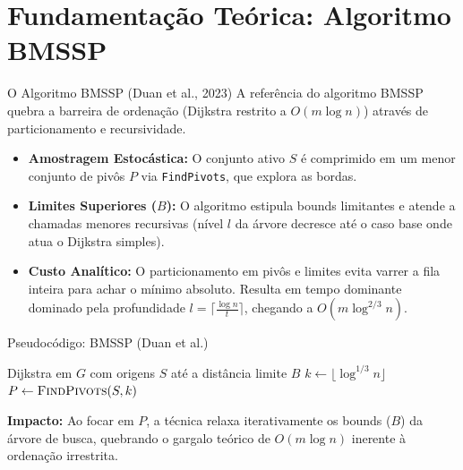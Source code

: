 \documentclass[aspectratio=169, 11pt]{beamer}
\begin{document}
\section{Fundamentação Teórica: Algoritmo BMSSP}
\begin{frame}{O Algoritmo BMSSP (Duan et al., 2023)}
    A referência do algoritmo BMSSP quebra a barreira de ordenação (Dijkstra restrito a $O(m \log n)$) através de particionamento e recursividade.
    
    \vspace{0.2cm}
    \begin{itemize}
        \item \textbf{Amostragem Estocástica:} O conjunto ativo $S$ é comprimido em um menor conjunto de pivôs $P$ via \texttt{FindPivots}, que explora as bordas.
        \item \textbf{Limites Superiores ($B$):} O algoritmo estipula bounds limitantes e atende a chamadas menores recursivas (nível $l$ da árvore decresce até o caso base onde atua o Dijkstra simples).
        \item \textbf{Custo Analítico:} O particionamento em pivôs e limites evita varrer a fila inteira para achar o mínimo absoluto. Resulta em tempo dominante dominado pela profundidade $l = \lceil \frac{\log n}{t} \rceil$, chegando a \textbf{$O(m \log^{2/3} n)$}.
    \end{itemize}
\end{frame}

\begin{frame}[fragile]{Pseudocódigo: BMSSP (Duan et al.)}
    \begin{algorithm}[H]
        \caption{BMSSP Simplificado}
        \small
        \begin{algorithmic}[1]
                 
                    \State Dijkstra em $G$ com origens $S$ até a distância limite $B$
                \Else
                    \State $k \gets \lfloor \log^{1/3} n \rfloor$ 
                    \State $P \gets \Call{FindPivots}{S, k}$ 
                    \State {} 
                    \State {} 
                \EndIf
            \EndProcedure
        \end{algorithmic}
    \end{algorithm}
    \vspace{0.2cm}
    \small \textbf{Impacto:} Ao focar em $P$, a técnica relaxa iterativamente os bounds ($B$) da árvore de busca, quebrando o gargalo teórico de $O(m \log n)$ inerente à ordenação irrestrita.
\end{frame}
\end{document}
